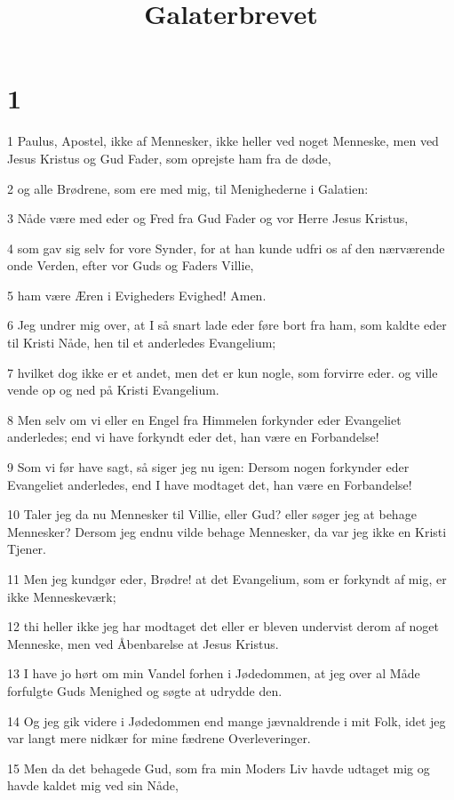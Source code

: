 

\title{Galaterbrevet}


\chapter{1}

\par 1 Paulus, Apostel, ikke af Mennesker, ikke heller ved noget Menneske, men ved Jesus Kristus og Gud Fader, som oprejste ham fra de døde,
\par 2 og alle Brødrene, som ere med mig, til Menighederne i Galatien:
\par 3 Nåde være med eder og Fred fra Gud Fader og vor Herre Jesus Kristus,
\par 4 som gav sig selv for vore Synder, for at han kunde udfri os af den nærværende onde Verden, efter vor Guds og Faders Villie,
\par 5 ham være Æren i Evigheders Evighed! Amen.
\par 6 Jeg undrer mig over, at I så snart lade eder føre bort fra ham, som kaldte eder til Kristi Nåde, hen til et anderledes Evangelium;
\par 7 hvilket dog ikke er et andet, men det er kun nogle, som forvirre eder. og ville vende op og ned på Kristi Evangelium.
\par 8 Men selv om vi eller en Engel fra Himmelen forkynder eder Evangeliet anderledes; end vi have forkyndt eder det, han være en Forbandelse!
\par 9 Som vi før have sagt, så siger jeg nu igen: Dersom nogen forkynder eder Evangeliet anderledes, end I have modtaget det, han være en Forbandelse!
\par 10 Taler jeg da nu Mennesker til Villie, eller Gud? eller søger jeg at behage Mennesker? Dersom jeg endnu vilde behage Mennesker, da var jeg ikke en Kristi Tjener.
\par 11 Men jeg kundgør eder, Brødre! at det Evangelium, som er forkyndt af mig, er ikke Menneskeværk;
\par 12 thi heller ikke jeg har modtaget det eller er bleven undervist derom af noget Menneske, men ved Åbenbarelse at Jesus Kristus.
\par 13 I have jo hørt om min Vandel forhen i Jødedommen, at jeg over al Måde forfulgte Guds Menighed og søgte at udrydde den.
\par 14 Og jeg gik videre i Jødedommen end mange jævnaldrende i mit Folk, idet jeg var langt mere nidkær for mine fædrene Overleveringer.
\par 15 Men da det behagede Gud, som fra min Moders Liv havde udtaget mig og havde kaldet mig ved sin Nåde,
